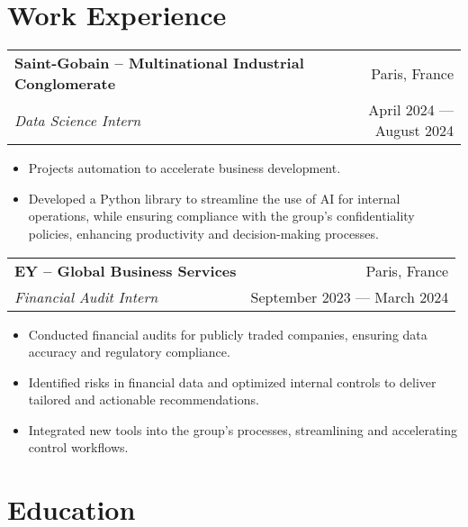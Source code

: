 \documentclass[a4paper,9pt]{extarticle}
\begin{document}
\section*{\faBriefcase \hspace{0.1em} Work Experience}

\begin{tabularx}{\textwidth}{@{}Xr@{}}
\textbf{Saint-Gobain -- Multinational Industrial Conglomerate} & Paris, France\\
\textit{Data Science Intern} & April 2024 — August 2024\\
\end{tabularx}
\vspace{-5pt}
\begin{itemize} \itemsep -1pt
    \item Projects automation to accelerate business development.
    \item Developed a Python library to streamline the use of AI for internal operations, while ensuring compliance with the group’s confidentiality policies, enhancing productivity and decision-making processes.
\end{itemize}

\vspace{5pt}
\noindent
\begin{tabularx}{\textwidth}{@{}Xr@{}}
\textbf{EY -- Global Business Services} & Paris, France\\
\textit{Financial Audit Intern} & September 2023 — March 2024\\
\end{tabularx}
\vspace{-5pt}
\begin{itemize} \itemsep -1pt
    \item Conducted financial audits for publicly traded companies, ensuring data accuracy and regulatory compliance.
    \item Identified risks in financial data and optimized internal controls to deliver tailored and actionable recommendations.
    \item Integrated new tools into the group’s processes, streamlining and accelerating control workflows.
\end{itemize}

\vspace{6pt}

\section*{\faGraduationCap \hspace{0.1em} Education}
\end{document}
